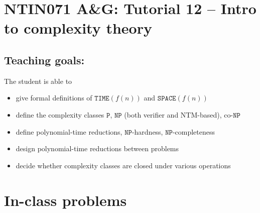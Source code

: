 \documentclass[a4paper,12pt]{amsart}
\begin{document}
\thispagestyle{empty}

\section*{NTIN071 A\&G: Tutorial 12 -- Intro to complexity theory}

\medskip

\subsection*{Teaching goals:} The student is able to

    \begin{itemize}\setlength{\itemsep}{0pt}
        \item give formal definitions of $\mathtt{TIME}(f(n))$ and $\mathtt{SPACE}(f(n))$
        \item define the complexity classes $\mathtt{P}$, $\mathtt{NP}$ (both verifier and NTM-based), co-$\mathtt{NP}$
        \item define polynomial-time reductions, $\mathtt{NP}$-hardness, $\mathtt{NP}$-completeness
        \item design polynomial-time reductions between problems
        \item decide whether complexity classes are closed under various operations
    \end{itemize}


\section*{In-class problems}
\end{document}
